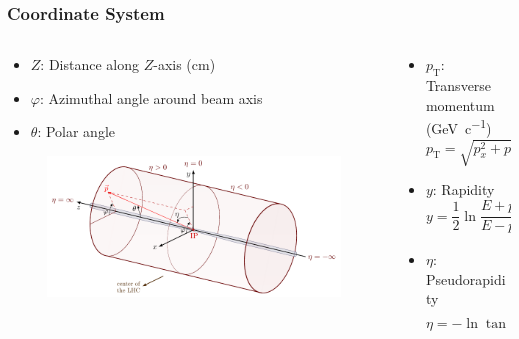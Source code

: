 \documentclass[11pt]{beamer}
\begin{document}
\begin{frame}
    \frametitle{Coordinate System}

    \begin{columns}[t]
        \begin{column}{0.6\textwidth}
            \begin{itemize}
                \item $Z$: Distance along $Z$-axis (\unit{\centi\metre})
                \item $\varphi$: Azimuthal angle around beam axis
                \item $\theta$: Polar angle
            \end{itemize}
            \begin{figure}[h]
                \begin{center}
                    \includegraphics[width=\textwidth]{Figs/coords.pdf}
                \end{center}
            \end{figure}
        \end{column}

        \begin{column}{0.4\textwidth}
            \begin{itemize}
                \item $p_{\mathrm{T}}$: Transverse momentum (\unit{\giga\electronvolt\per c})
                \begin{equation*}
                    p_{\mathrm{T}}=\sqrt{p_x^2+p_y^2}
                \end{equation*}
                \item $y$: Rapidity
                \begin{equation*}
                    y=\frac{1}{2}\ln \frac{E+p_z}{E-p_z}
                \end{equation*}
                \item $\eta$: Pseudorapidity
                \begin{equation*}
                    \eta=-\ln\tan\frac{\theta}{2}
                \end{equation*}
            \end{itemize}
        \end{column}
    \end{columns}

\end{frame}
\end{document}
